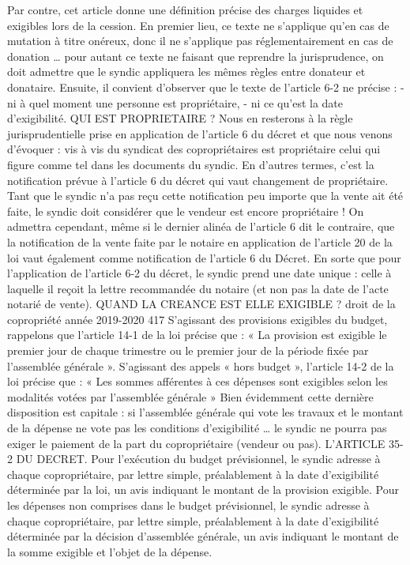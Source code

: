 Par contre, cet article donne une définition précise des charges liquides et exigibles lors de la cession.
En premier lieu, ce texte ne s’applique qu’en cas de mutation à titre onéreux, donc il ne s’applique pas réglementairement en cas de donation … pour autant ce texte ne faisant que reprendre la jurisprudence, on doit admettre que le syndic appliquera les mêmes règles entre donateur et donataire.
Ensuite, il convient d’observer que le texte de l’article 6-2 ne précise :
- ni à quel moment une personne est propriétaire,
- ni ce qu’est la date d’exigibilité.
QUI EST PROPRIETAIRE ?
Nous en resterons à la règle jurisprudentielle prise en application de l’article 6 du décret et que nous venons d’évoquer : vis à vis du syndicat des copropriétaires est propriétaire celui qui figure comme tel dans les documents du syndic. En d’autres termes, c’est la notification prévue à l’article 6 du décret qui vaut changement de propriétaire.
Tant que le syndic n’a pas reçu cette notification peu importe que la vente ait été faite, le syndic doit considérer que le vendeur est encore propriétaire !
On admettra cependant, même si le dernier alinéa de l’article 6 dit le contraire, que la notification de la vente faite par le notaire en application de l’article 20 de la loi vaut également comme notification de l’article 6 du Décret.
En sorte que pour l’application de l’article 6-2 du décret, le syndic prend une date unique : celle à laquelle il reçoit la lettre recommandée du notaire (et non pas la date de l’acte notarié de vente).
QUAND LA CREANCE EST ELLE EXIGIBLE ?
droit de la copropriété année 2019-2020
417
S’agissant des provisions exigibles du budget, rappelons que l’article 14-1 de la loi précise que :
« La provision est exigible le premier jour de chaque trimestre ou le premier jour de la période fixée par l'assemblée générale ».
S’agissant des appels « hors budget », l’article 14-2 de la loi précise que :
« Les sommes afférentes à ces dépenses sont exigibles selon les modalités votées par l'assemblée générale »
Bien évidemment cette dernière disposition est capitale : si l'assemblée générale qui vote les travaux et le montant de la dépense ne vote pas les conditions d’exigibilité … le syndic ne pourra pas exiger le paiement de la part du copropriétaire (vendeur ou pas).
L’ARTICLE 35-2 DU DECRET.
Pour l'exécution du budget prévisionnel, le syndic adresse à chaque copropriétaire, par lettre simple, préalablement à la date d’exigibilité déterminée par la loi, un avis indiquant le montant de la provision exigible.
Pour les dépenses non comprises dans le budget prévisionnel, le syndic adresse à chaque copropriétaire, par lettre simple, préalablement à la date d'exigibilité déterminée par la décision d’assemblée générale, un avis indiquant le montant de la somme exigible et l'objet de la dépense.
